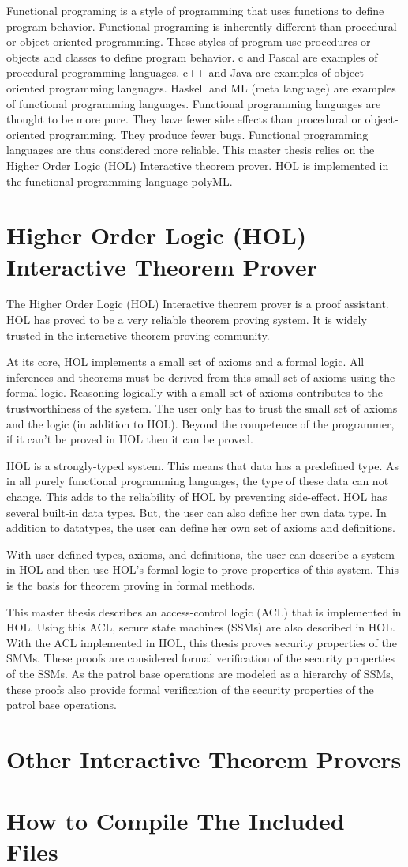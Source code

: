 \documentclass[../../main/main.tex]{subfiles}
\begin{document}
Functional programing is a style of programming that uses functions to define program behavior.  Functional programing is inherently different than procedural or object-oriented programming. These styles of program use procedures or objects and classes to define program behavior.  c  and Pascal are examples of procedural programming languages.  c++ and Java are examples of object-oriented programming languages.  Haskell and ML (meta language) are examples of functional programming languages.  Functional programming languages are thought to be more pure.  They have fewer side effects than procedural or object-oriented programming.  They produce fewer bugs.  Functional programming languages are thus considered more reliable.   
This master thesis relies on the Higher Order Logic (HOL) Interactive theorem prover.  HOL is implemented in the functional programming language polyML.

\section{Higher Order Logic (HOL) Interactive Theorem Prover}
The Higher Order Logic (HOL) Interactive theorem prover is a proof assistant.  HOL has proved to be a very reliable theorem proving system.  It is widely trusted in the interactive theorem proving community.

At its core, HOL implements a small set of axioms and a formal logic.  All inferences and theorems must be derived from this small set of axioms using the formal logic.  Reasoning logically with a small set of axioms contributes to the trustworthiness of the system.  The user only has to trust the small set of axioms and the logic (in addition to HOL).  Beyond the competence of the programmer, if it can't be proved in HOL then it can be proved.  

HOL is a strongly-typed system.  This means that data has a predefined type.  As in all purely functional programming languages, the type of these data can not change.  This adds to the reliability of HOL by preventing side-effect. HOL has several built-in data types.  But, the user can also define her own data type.   In addition to datatypes, the user can define her own set of axioms and definitions.  

With user-defined types, axioms, and definitions, the user can describe a system in HOL and then use HOL's formal logic to prove properties of this system.  This is the basis for theorem proving in formal methods.

This master thesis describes an access-control logic (ACL) that is implemented in HOL.  Using this ACL, secure state machines (SSMs) are also described in HOL.  With the ACL implemented in HOL, this thesis proves security properties of the SMMs.  These proofs are considered formal verification of the security properties of the SSMs.  As the patrol base operations are modeled as a hierarchy of SSMs, these proofs also provide formal verification of the security properties of the patrol base operations.


\section{Other Interactive Theorem Provers}
\section{How to Compile The Included Files}
\end{document}
